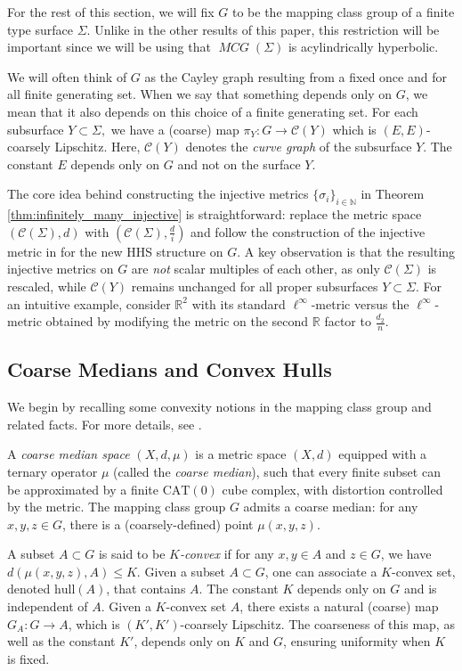 \documentclass{amsart}
\numberwithin{thm}{section}
\numberwithin{figure}{section}
\theoremstyle{definition}
\theoremstyle{definition}
\theoremstyle{remark}
\newcommand{\CAT}{\mathrm{CAT}}
\newcommand{\hull}{\mathrm{hull}}
\numberwithin{equation}{section}
\DeclareMathOperator{\MCG}{\mathit{MCG}}
\theoremstyle{plain}
\begin{document}
 For the rest of this section, we will fix $G$ to be the mapping class group of a finite type surface $\Sigma$. Unlike in the other results of this paper, this restriction will be important since we will be using that $\MCG(\Sigma)$ is acylindrically hyperbolic.
 
 We will often think of $G$ as the Cayley graph resulting from a fixed once and for all finite generating set. When we say that something depends only on $G$, we mean that it also depends on this choice of a finite generating set. For each subsurface $Y \subset \Sigma,$ we have a (coarse) map $\pi_Y:G \rightarrow \mathcal{C}(Y)$ which is $(E,E)$-coarsely Lipschitz. Here, $\mathcal{C}(Y)$ denotes the \emph{curve graph} of the subsurface $Y.$ The constant $E$ depends only on $G$ and not on the surface $Y.$


 

The core idea behind constructing the injective metrics $\{\sigma_i\}_{i \in \mathbb{N}}$ in Theorem \ref{thm:infinitely_many_injective} is straightforward: replace the metric space $(\mathcal{C}(\Sigma),d)$ with $(\mathcal{C}(\Sigma),\frac{d}{i})$ and follow the construction of the injective metric in \cite{PetytZalloum24} for the new HHS structure on $G$. A key observation is that the resulting injective metrics on $G$ are \emph{not} scalar multiples of each other, as only $\mathcal{C}(\Sigma)$ is rescaled, while $\mathcal{C}(Y)$ remains unchanged for all proper subsurfaces $Y \subset \Sigma$. For an intuitive example, consider $\mathbb{R}^2$ with its standard $\ell^\infty$-metric versus the $\ell^\infty$-metric obtained by modifying the metric on the second $\mathbb{R}$ factor to $\frac{d_2}{n}$.

\subsection{Coarse Medians and Convex Hulls}
We begin by recalling some convexity notions in the mapping class group and related facts. For more details, see \cite{bowditch:convex}. 

A \emph{coarse median space} $(X,d, \mu)$ is a metric space $(X,d)$ equipped with a ternary operator $\mu$ (called the \emph{coarse median}), such that every finite subset can be approximated by a finite $\CAT(0)$ cube complex, with distortion controlled by the metric. The mapping class group $G$ admits a coarse median: for any $x,y,z \in G$, there is a (coarsely-defined) point $\mu(x,y,z)$. 

A subset $A \subset G$ is said to be \emph{$K$-convex} if for any $x,y \in A$ and $z \in G$, we have $d(\mu(x,y,z), A) \leq K.$ Given a subset $A \subset G$, one can associate a $K$-convex set, denoted $\hull(A)$, that contains $A$. The constant $K$ depends only on $G$ and is independent of $A$. Given a $K$-convex set $A$, there exists a natural (coarse) map $G_A: G \to A$, which is $(K',K')$-coarsely Lipschitz. The coarseness of this map, as well as the constant $K'$, depends only on $K$ and $G$, ensuring uniformity when $K$ is fixed.
\end{document}
